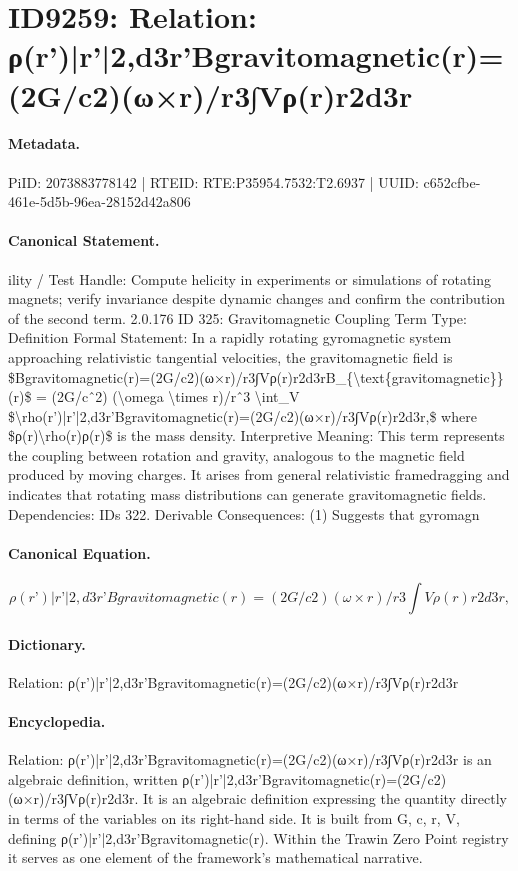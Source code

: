 \section*{ID9259: Relation: ρ(r’)|r’|2,d3r’Bgravitomagnetic(r)=(2G/c2)(ω×r)/r3∫Vρ(r)r2d3r}
\paragraph{Metadata.}
PiID: 2073883778142 | RTEID: RTE:P35954.7532:T2.6937 | UUID: c652cfbe-461e-5d5b-96ea-28152d42a806

\paragraph{Canonical Statement.}
ility / Test Handle: Compute helicity in experiments or simulations of rotating magnets; verify invariance despite dynamic changes and confirm the contribution of the second term. 2.0.176 ID 325: Gravitomagnetic Coupling Term Type: Definition Formal Statement: In a rapidly rotating gyromagnetic system approaching relativistic tangential velocities, the gravitomagnetic field is \$Bgravitomagnetic(r)=(2G/c2)(ω×r)/r3∫Vρ(r)r2d3rB\_\{\textbackslash{}text\{gravitomagnetic\}\}(r)\$ = (2G/cˆ2) (\textbackslash{}omega \textbackslash{}times r)/rˆ3 \textbackslash{}int\_V \$\textbackslash{}rho(r’)|r’|2,d3r’Bgravitomagnetic(r)=(2G/c2)(ω×r)/r3∫Vρ(r)r2d3r,\$ where \$ρ(r)\textbackslash{}rho(r)ρ(r)\$ is the mass density. Interpretive Meaning: This term represents the coupling between rotation and gravity, analogous to the magnetic field produced by moving charges. It arises from general relativistic framedragging and indicates that rotating mass distributions can generate gravitomagnetic fields. Dependencies: IDs 322. Derivable Consequences: (1) Suggests that gyromagn

\paragraph{Canonical Equation.}
\[
\rho(r’)|r’|2,d3r’Bgravitomagnetic(r)=(2G/c2)(ω×r)/r3∫Vρ(r)r2d3r,
\]

\paragraph{Dictionary.}
Relation: ρ(r’)|r’|2,d3r’Bgravitomagnetic(r)=(2G/c2)(ω×r)/r3∫Vρ(r)r2d3r

\paragraph{Encyclopedia.}
Relation: ρ(r’)|r’|2,d3r’Bgravitomagnetic(r)=(2G/c2)(ω×r)/r3∫Vρ(r)r2d3r is an algebraic definition, written ρ(r’)|r’|2,d3r’Bgravitomagnetic(r)=(2G/c2)(ω×r)/r3∫Vρ(r)r2d3r. It is an algebraic definition expressing the quantity directly in terms of the variables on its right-hand side. It is built from G, c, r, V, defining ρ(r’)|r’|2,d3r’Bgravitomagnetic(r). Within the Trawin Zero Point registry it serves as one element of the framework's mathematical narrative.
